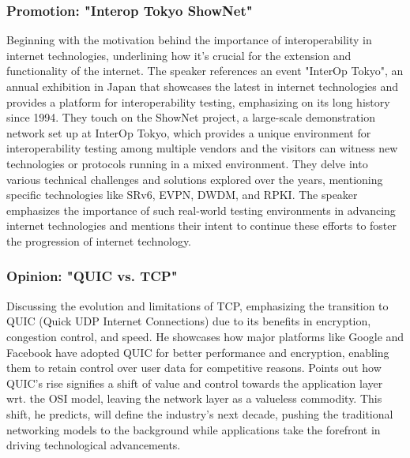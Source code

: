 \documentclass[twocolumn]{article}
\begin{document}
\subsubsection*{Promotion: "Interop Tokyo ShowNet"}
Beginning with the motivation behind the importance of interoperability in internet technologies, underlining how it's crucial for the extension and functionality of the internet. The speaker references an event "InterOp Tokyo", an annual exhibition in Japan that showcases the latest in internet technologies and provides a platform for interoperability testing, emphasizing on its long history since 1994. They touch on the ShowNet project, a large-scale demonstration network set up at InterOp Tokyo, which provides a unique environment for interoperability testing among multiple vendors and the visitors can witness new technologies or protocols running in a mixed environment. They delve into various technical challenges and solutions explored over the years, mentioning specific technologies like SRv6, EVPN, DWDM, and RPKI. The speaker emphasizes the importance of such real-world testing environments in advancing internet technologies and mentions their intent to continue these efforts to foster the progression of internet technology.

\subsubsection*{Opinion: "QUIC vs. TCP"}
Discussing the evolution and limitations of TCP, emphasizing the transition to QUIC (Quick UDP Internet Connections) due to its benefits in encryption, congestion control, and speed. He showcases how major platforms like Google and Facebook have adopted QUIC for better performance and encryption, enabling them to retain control over user data for competitive reasons. Points out how QUIC's rise signifies a shift of value and control towards the application layer wrt. the OSI model, leaving the network layer as a valueless commodity. This shift, he predicts, will define the industry's next decade, pushing the traditional networking models to the background while applications take the forefront in driving technological advancements.
\end{document}
